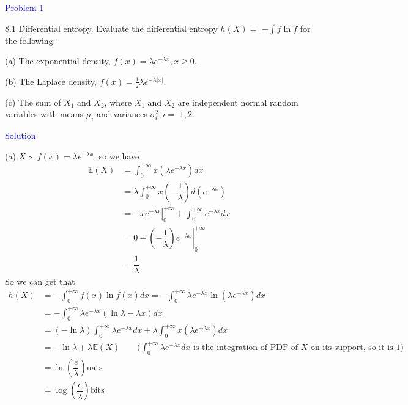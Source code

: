 \textcolor{blue}{Problem 1}

8.1 Differential entropy. Evaluate the differential entropy $h(X)=$ $-\int f \ln f$ for the following:

(a) The exponential density, $f(x)=\lambda e^{-\lambda x}, x \geq 0$.

(b) The Laplace density, $f(x)=\frac{1}{2} \lambda e^{-\lambda|x|}$.

(c) The sum of $X_1$ and $X_2$, where $X_1$ and $X_2$ are independent normal random variables with means $\mu_i$ and variances $\sigma_i^2, i=$ $1,2$.

\textcolor{blue}{Solution}

(a) $X\sim f(x)=\lambda e^{-\lambda x}$, so we have
\begin{align*}
\mathbb{E}(X) &= \int_0^{+\infty} x\left(\lambda e^{-\lambda x}\right)dx \\
&= \lambda\int_0^{+\infty} x \left(-\dfrac{1}{\lambda}\right)d\left(e^{-\lambda x}\right) \\
&= \left. -xe^{-\lambda x} \right|_0^{+\infty} + \int_0^{+\infty} e^{-\lambda x}dx \\
&= 0 + \left.\left(-\dfrac{1}{\lambda}\right) e^{-\lambda x} \right|_0^{+\infty} \\
&= \dfrac{1}{\lambda}
\end{align*}
So we can get that
\begin{align*}
h(X) &= -\int_0^{+\infty} f(x)\ln f(x)dx = -\int_0^{+\infty} \lambda e^{-\lambda x} \ln \left(\lambda e^{-\lambda x}\right)dx \\
&= -\int_0^{+\infty} \lambda e^{-\lambda x} (\ln \lambda - \lambda x)dx \\
&= \left(-\ln \lambda\right) \int_0^{+\infty} \lambda e^{-\lambda x}dx + \lambda \int_0^{+\infty} x\left(\lambda e^{-\lambda x}\right)dx \\
&= -\ln \lambda + \lambda\mathbb{E}(X) \qquad \text{($\int_0^{+\infty} \lambda e^{-\lambda x}dx$ is the integration of PDF of $X$ on its support, so it is $1$)} \\
&= \ln\left(\dfrac{e}{\lambda}\right) \text{nats} \\
&= \log\left(\dfrac{e}{\lambda}\right) \text{bits}
\end{align*}

